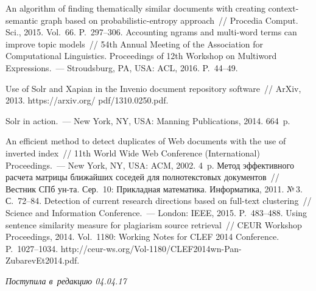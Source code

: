 \begin{multicols}{2}
{{\begin{thebibliography}{99}
 An algorithm of finding thematically 
similar documents with creating context-semantic graph based on probabilistic-entropy approach~// 
Procedia Comput. Sci., 2015. Vol.~66. P.~297--306.
 Accounting ngrams and multi-word terms can improve topic 
models~// 54th Annual Meeting of the Association for Computational Linguistics. Proceedings of 
12th Workshop on Multiword Expressions.~--- Stroudsburg, PA, USA: ACL, 2016. 
P.~44--49.

 Use of Solr and Xapian in the 
Invenio document repository software~// ArXiv, 2013. {\sf https://arxiv.org/ pdf/1310.0250.pdf}. 

 Solr in action.~--- New York, NY, USA: Manning 
Publications, 2014. 664~p.

 An efficient method to detect duplicates of 
Web documents with the use of inverted index~// 11th World Wide Web Conference (International) 
Proceedings.~--- New York, NY, USA: ACM, 2002. 4~p.
 Метод эффективного расчета матрицы ближайших соседей 
для полнотекстовых документов~// Вестник СПб ун-та. Сер.~10: 
Прикладная математика. Информатика, 2011. №\,3. С.~72--84.
 Detection of 
current research directions based on full-text clustering~// Science and Information Conference.~--- 
London: IEEE, 2015. P.~483--488.
 Using sentence similarity measure for plagiarism source retrieval~// 
CEUR Workshop Proceedings, 2014. Vol.~1180: Working Notes for CLEF 2014 Conference. 
P.~1027--1034. {\sf http://ceur-ws.org/Vol-1180/CLEF2014wn-Pan-ZubarevEt2014.pdf}.
 \end{thebibliography}

 }
 }

\end{multicols}

\vspace*{-6pt}

\hfill{\small\textit{Поступила в~редакцию 04.04.17}}

\vspace*{8pt}



